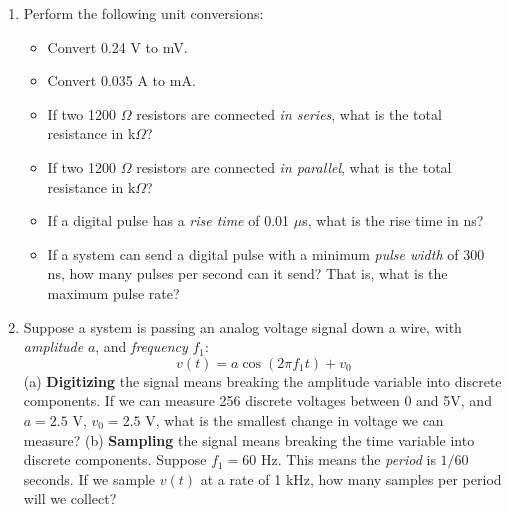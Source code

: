 \documentclass{article}
\begin{document}
\begin{enumerate}
\item Perform the following unit conversions:
\begin{itemize}
\item Convert 0.24 V to mV. \\ \vspace{0.5cm}
\item Convert 0.035 A to mA. \\ \vspace{0.5cm}
\item If two 1200 $\Omega$ resistors are connected \textit{in series}, what is the total resistance in k$\Omega$? \\ \vspace{0.5cm}
\item If two 1200 $\Omega$ resistors are connected \textit{in parallel}, what is the total resistance in k$\Omega$? \\ \vspace{0.5cm}
\item If a digital pulse has a \textit{rise time} of 0.01 $\mu$s, what is the rise time in ns? \\ \vspace{0.5cm}
\item If a system can send a digital pulse with a minimum \textit{pulse width} of 300 ns, how many pulses per second can it send?  That is, what is the maximum pulse rate? \\ \vspace{0.5cm}
\end{itemize}
\item Suppose a system is passing an analog voltage signal down a wire, with \textit{amplitude} $a$, and \textit{frequency} $f_1$:
\begin{equation}
v(t) = a\cos(2\pi f_1 t) + v_0
\end{equation}
(a) \textbf{Digitizing} the signal means breaking the amplitude variable into discrete components.  If we can measure 256 discrete voltages between 0 and 5V, and $a = 2.5$ V, $v_0 = 2.5$ V, what is the smallest change in voltage we can measure? (b) \textbf{Sampling} the signal means breaking the time variable into discrete components.  Suppose $f_1 = 60$ Hz.  This means the \textit{period} is $1/60$ seconds.  If we sample $v(t)$ at a rate of 1 kHz, how many samples per period will we collect?
\end{enumerate}
\end{document}
